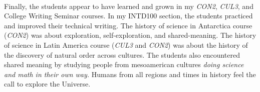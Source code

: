 \documentclass[../../../main.tex]{subfiles}
\begin{document}
\\
\vspace{0.15cm}
Finally, the students appear to have learned and grown in my \textit{CON2}, \textit{CUL3}, and College Writing Seminar courses.  In my INTD100 section, the students practiced and improved their technical writing.  The history of science in Antarctica course (\textit{CON2}) was about exploration, self-exploration, and shared-meaning.  The history of science in Latin America course (\textit{CUL3} and \textit{CON2}) was about the history of the discovery of natural order across cultures.  The students also encountered shared meaning by studying people from mesoamerican cultures \textit{doing science and math in their own way.}  Humans from all regions and times in history feel the call to explore the Universe.
\end{document}
